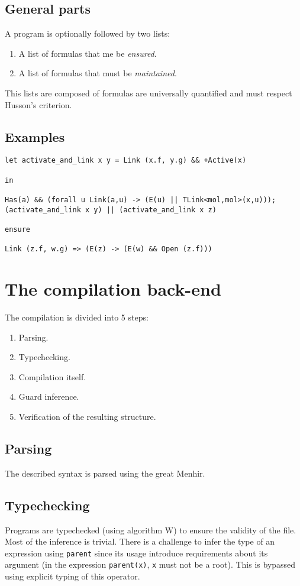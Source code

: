 \documentclass[10pt,a4paper]{article}
\newcommand{\ocaml}{\texttt}
\begin{document}
\subsection{General parts}
A program is optionally followed by two lists:
\begin{enumerate}
\item A list of formulas that me be \emph{ensured}.
\item A list of formulas that must be \emph{maintained}.
\end{enumerate}

This lists are composed of formulas are universally quantified and must respect Husson's criterion.

\subsection{Examples}
\begin{verbatim}
let activate_and_link x y = Link (x.f, y.g) && +Active(x)

in

Has(a) && (forall u Link(a,u) -> (E(u) || TLink<mol,mol>(x,u)));
(activate_and_link x y) || (activate_and_link x z)

ensure

Link (z.f, w.g) => (E(z) -> (E(w) && Open (z.f)))
\end{verbatim}


\section{The compilation back-end}
The compilation is divided into 5 steps:
\begin{enumerate}
\item Parsing.
\item Typechecking.
\item Compilation itself.
\item Guard inference.
\item Verification of the resulting structure.
\end{enumerate}

\subsection{Parsing}
The described syntax is parsed using the great Menhir\cite{menhir}.

\subsection{Typechecking}
Programs are typechecked (using algorithm W) to ensure the validity of the file. Most of the inference is trivial. There is a challenge to infer the type of an expression using \ocaml{parent} since its usage introduce requirements about its argument (in the expression \ocaml{parent(x)}, \ocaml{x} must not be a root). This is bypassed using explicit typing of this operator.
\end{document}
